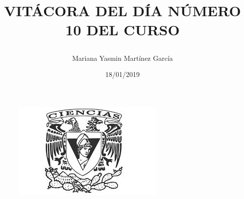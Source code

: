 \documentclass{article}
\title{\Huge\item\color{blue}\textbf{VITÁCORA DEL DÍA NÚMERO 10 DEL CURSO}}
\author{\Large Mariana Yasmin Martínez García}
\date{\Large 18/01/2019}
\begin{document}
\begin{figure}[t]
	\centering
	\includegraphics[width=0.7\linewidth]{Imagenes/1}
	\caption{}
	\label{fig:1}
\end{figure}

	\maketitle
		
	\newpage
	
\end{document}
